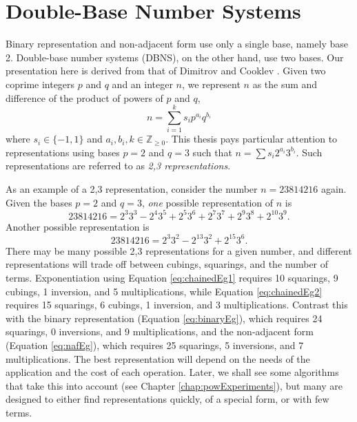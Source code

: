 \documentclass{ucalgthes1}
\theoremstyle{definition}
\newcommand{\ZZgez}{\mathbb{Z}_{\ge 0}}
\begin{document}
\section{Double-Base Number Systems}
\label{sec:dbns}

Binary representation and non-adjacent form use only a single base, namely base 2.  Double-base number systems (DBNS), on the other hand, use two bases.  Our presentation here is derived from that of Dimitrov and Cooklev \cite{Dimitrov1995a, Dimitrov1995b}.  Given two coprime integers $p$ and $q$ and an integer $n$, we represent $n$ as the sum and difference of the product of powers of $p$ and $q$,
\begin{equation}\label{eq:generalDbnsForm}
	n = \sum_{i=1}^k s_i p^{a_i} q^{b_i}
\end{equation}
where $s_i \in \{-1, 1\}$ and $a_i, b_i, k \in \ZZgez$. This thesis pays particular attention to representations using bases $p=2$ and $q=3$ such that $n = \sum s_i 2^{a_i} 3^{b_i}$.  Such representations are referred to as \emph{2,3 representations}.

As an example of a 2,3 representation, consider the number $n=23814216$ again.  Given the bases $p=2$ and $q=3$, \emph{one} possible representation of $n$ is
\begin{equation}
\label{eq:chainedEg1}
	23814216 = 2^3 3^3 - 2^4 3^5 + 2^5 3^6  + 2^7 3^7 + 2^9 3^8 + 2^{10} 3^9.
\end{equation}
Another possible representation is
\begin{equation}
\label{eq:chainedEg2}
	23814216 = 2^3 3^2 -2^{13} 3^2 +2^{15} 3^6.
\end{equation}
There may be many possible 2,3 representations for a given number, and different representations will trade off between cubings, squarings, and the number of terms.  Exponentiation using Equation \eqref{eq:chainedEg1} requires 10 squarings, 9 cubings, 1 inversion, and 5 multiplications, while Equation \eqref{eq:chainedEg2} requires 15 squarings, 6 cubings, 1 inversion, and 3 multiplications.  Contrast this with the binary representation (Equation \eqref{eq:binaryEg}), which requires 24 squarings, 0 inversions, and 9 multiplications, and the non-adjacent form (Equation \eqref{eq:nafEg}), which requires 25 squarings, 5 inversions, and 7 multiplications.  The best representation will depend on the needs of the application and the cost of each operation.  Later, we shall see some algorithms that take this into account (see Chapter \ref{chap:powExperiments}), but many are designed to either find representations quickly, of a special form, or with few terms.
\end{document}
